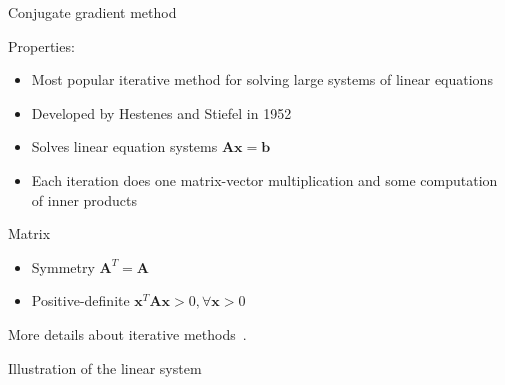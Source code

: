 \documentclass[12pt,t]{beamer}
\begin{document}
\begin{frame}{Conjugate gradient method}

\begin{block}{Properties:}
\begin{itemize}
\item Most popular iterative method for solving large systems of linear equations
\item Developed by Hestenes and Stiefel in 1952~\cite{hestenes1952methods}
\item Solves linear equation systems $\mathbf{A} \mathbf{x} = \mathbf{b}$
\item Each iteration does one matrix-vector multiplication and some computation of inner products
\end{itemize}
\end{block}

\begin{block}{Matrix}
\begin{itemize}
\item Symmetry $\mathbf{A}^T = \mathbf{A}$
\item Positive-definite $\mathbf{x}^T \mathbf{A} \mathbf{x} > 0, \forall \mathbf{x}>0$
\end{itemize}
\end{block}

More details about iterative methods~\cite{briggs2000multigrid}.
\end{frame}


\begin{frame}{Illustration of the linear system}

\begin{center}
\end{center}

\end{frame}
\end{document}
